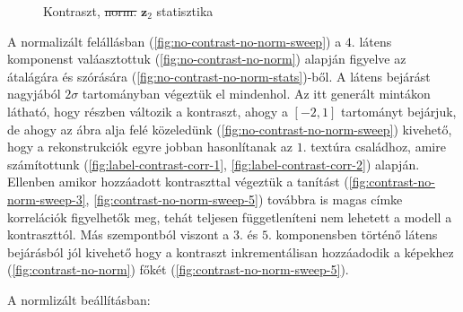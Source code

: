 \documentclass[12pt, english]{article}
\begin{document}
\begin{figure}[H]
\begin{minipage}{0.5\linewidth}
    \caption{Kontraszt, \st{norm.} \newline $\bm{z}_{2}$ statisztika} 
    \label{fig:contrast-no-norm-stats}
  \end{minipage}
\end{figure}

\vspace{4mm}

\par A normalizált felállásban (\ref{fig:no-contrast-no-norm-sweep}) a $4.$ látens komponenst valáasztottuk (\ref{fig:no-contrast-no-norm}) alapján figyelve az átalágára és szórására (\ref{fig:no-contrast-no-norm-stats})-ből. A látens bejárást nagyjából $2\sigma$ tartományban végeztük el mindenhol. Az itt generált mintákon látható, hogy részben változik a kontraszt, ahogy a $[-2, 1]$ tartományt bejárjuk, de ahogy az ábra alja felé közeledünk (\ref{fig:no-contrast-no-norm-sweep}) kivehető, hogy a rekonstrukciók egyre jobban hasonlítanak az $1.$ textúra családhoz, amire számítottunk (\ref{fig:label-contrast-corr-1}, \ref{fig:label-contrast-corr-2}) alapján. Ellenben amikor hozzáadott kontraszttal végeztük a tanítást (\ref{fig:contrast-no-norm-sweep-3}, \ref{fig:contrast-no-norm-sweep-5}) továbbra is magas címke korrelációk figyelhetők meg, tehát teljesen függetleníteni nem lehetett a modell a kontraszttól. Más szempontból viszont a $3.$ és $5.$ komponensben történő látens bejárásból jól kivehető hogy a kontraszt inkrementálisan hozzáadodik a képekhez (\ref{fig:contrast-no-norm}) főkét (\ref{fig:contrast-no-norm-sweep-5}).

\vspace{4mm}

\par A normlizált beállításban:

\vspace{4mm}
\end{document}
